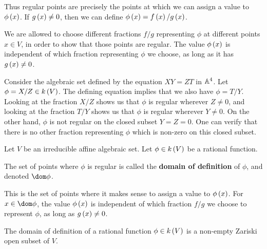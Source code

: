 Thus regular points are precisely the points at which we can assign a value to $ \phi\br{x} $. If $ g\br{x} \ne 0 $, then we can define $ \phi\br{x} = f\br{x} / g\br{x} $.

\begin{note*}
We are allowed to choose different fractions $ f / g $ representing $ \phi $ at different points $ x \in V $, in order to show that those points are regular. The value $ \phi\br{x} $ is independent of which fraction representing $ \phi $ we choose, as long as it has $ g\br{x} \ne 0 $.
\end{note*}

\begin{example*}
Consider the algebraic set defined by the equation $ XY = ZT $ in $ \AA^4 $. Let $ \phi = X / Z \in k\br{V} $. The defining equation implies that we also have $ \phi = T / Y $. Looking at the fraction $ X / Z $ shows us that $ \phi $ is regular wherever $ Z \ne 0 $, and looking at the fraction $ T / Y $ shows us that $ \phi $ is regular wherever $ Y \ne 0 $. On the other hand, $ \phi $ is not regular on the closed subset $ Y = Z = 0 $. One can verify that there is no other fraction representing $ \phi $ which is non-zero on this closed subset.
\end{example*}


Let $ V $ be an irreducible affine algebraic set. Let $ \phi \in k\br{V} $ be a rational function.

\begin{definition*}
The set of points where $ \phi $ is regular is called the \textbf{domain of definition} of $ \phi $, and denoted $ \dom \phi $.
\end{definition*}

This is the set of points where it makes sense to assign a value to $ \phi\br{x} $. For $ x \in \dom \phi $, the value $ \phi\br{x} $ is independent of which fraction $ f / g $ we choose to represent $ \phi $, as long as $ g\br{x} \ne 0 $.

\begin{lemma}
The domain of definition of a rational function $ \phi \in k\br{V} $ is a non-empty Zariski open subset of $ V $.
\end{lemma}

